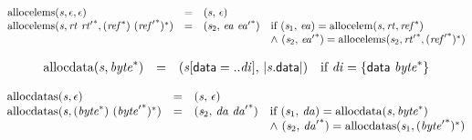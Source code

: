 $$
\begin{array}{@{}lcl@{}l@{}}
{\mathrm{allocelems}}({\mathit{s}}, \epsilon, \epsilon) &=& ({\mathit{s}},\, \epsilon) &  \\
{\mathrm{allocelems}}({\mathit{s}}, {\mathit{rt}}~{{\mathit{rt}'}^\ast}, ({{\mathit{ref}}^\ast})~{({{\mathit{ref}'}^\ast})^\ast}) &=& ({\mathit{s}}_{{2}},\, {\mathit{ea}}~{{\mathit{ea}'}^\ast}) &\quad
  \mbox{if}~({\mathit{s}}_{{1}},\, {\mathit{ea}}) = {\mathrm{allocelem}}({\mathit{s}}, {\mathit{rt}}, {{\mathit{ref}}^\ast}) \\
 &&&\quad {\land}~({\mathit{s}}_{{2}},\, {{\mathit{ea}'}^\ast}) = {\mathrm{allocelems}}({\mathit{s}}_{{2}}, {{\mathit{rt}'}^\ast}, {({{\mathit{ref}'}^\ast})^\ast}) \\
\end{array}
$$

$$
\begin{array}{@{}lcl@{}l@{}}
{\mathrm{allocdata}}({\mathit{s}}, {{\mathit{byte}}^\ast}) &=& ({\mathit{s}}{}[\mathsf{data} = ..{\mathit{di}}],\, {|{\mathit{s}}.\mathsf{data}|}) &\quad
  \mbox{if}~{\mathit{di}} = \{ \begin{array}[t]{@{}l@{}}
\mathsf{data}~{{\mathit{byte}}^\ast} \}\end{array} \\
\end{array}
$$

$$
\begin{array}{@{}lcl@{}l@{}}
{\mathrm{allocdatas}}({\mathit{s}}, \epsilon) &=& ({\mathit{s}},\, \epsilon) &  \\
{\mathrm{allocdatas}}({\mathit{s}}, ({{\mathit{byte}}^\ast})~{({{\mathit{byte}'}^\ast})^\ast}) &=& ({\mathit{s}}_{{2}},\, {\mathit{da}}~{{\mathit{da}'}^\ast}) &\quad
  \mbox{if}~({\mathit{s}}_{{1}},\, {\mathit{da}}) = {\mathrm{allocdata}}({\mathit{s}}, {{\mathit{byte}}^\ast}) \\
 &&&\quad {\land}~({\mathit{s}}_{{2}},\, {{\mathit{da}'}^\ast}) = {\mathrm{allocdatas}}({\mathit{s}}_{{1}}, {({{\mathit{byte}'}^\ast})^\ast}) \\
\end{array}
$$

\vspace{1ex}

